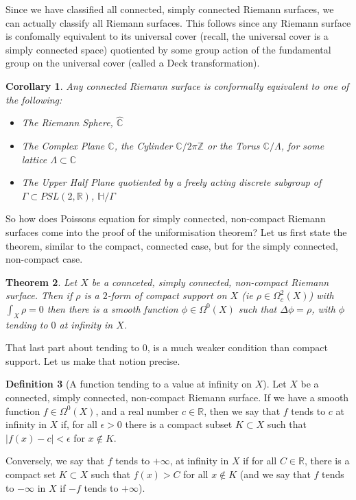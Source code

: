 \documentclass[11pt]{report}
\newtheorem{thm}{Theorem}[section]
\newtheorem{cor}[thm]{Corollary}
\theoremstyle{definition}
\newtheorem{defn}[thm]{Definition}
\begin{document}
Since we have classified all connected, simply connected Riemann surfaces, we can actually classify all Riemann surfaces. This follows since any Riemann surface is confomally equivalent to its universal cover (recall, the universal cover is a simply connected space) quotiented by some group action of the fundamental group on the universal cover (called a Deck transformation).
\begin{cor}
  Any connected Riemann surface is conformally equivalent to one of the following:
  \begin{itemize}
    \item The Riemann Sphere, $\hat{\mathbb{C}}$
    \item The Complex Plane $\mathbb{C}$, the Cylinder $\mathbb{C}/2\pi \mathbb{Z}$ or the Torus $\mathbb{C}/\Lambda$, for some lattice $\Lambda \subset \mathbb{C}$
    \item The Upper Half Plane quotiented by a freely acting discrete subgroup of $\Gamma \subset PSL(2,\mathbb{R})$, $\mathbb{H}/\Gamma$ 
  \end{itemize}
\end{cor}
So how does Poissons equation for simply connected, non-compact Riemann surfaces come into the proof of the uniformisation theorem? Let us first state the theorem, similar to the compact, connected case, but for the simply connected, non-compact case.
\begin{thm}\label{NonCompactPoissons}
  Let $X$ be a connceted, simply connected, non-compact Riemann surface. Then if $\rho$ is a $2$-form of compact support on $X$ (ie $\rho \in \Omega^2_c(X)$) with $\int_X \rho = 0$ then there is a smooth function $\phi \in \Omega^0(X)$ such that $\Delta \phi = \rho$, with $\phi$ tending to $0$ at infinity in $X$.
\end{thm}
That last part about tending to $0$, is a much weaker condition than compact support. Let us make that notion precise.
\begin{defn}[A function tending to a value at infinity on $X$]
  Let $X$ be a connected, simply connected, non-compact Riemann surface. If we have a smooth function $f \in \Omega^0(X)$, and a real number $c \in \mathbb{R}$, then we say that $f$ tends to $c$ at infinity in $X$ if, for all $\epsilon > 0$ there is a compact subset $K \subset X$ such that $|f(x) - c| < \epsilon$ for $x \notin K$.

  Conversely, we say that $f$ tends to $+\infty$, at infinity in $X$ if for all $C \in \mathbb{R}$, there is a compact set $K \subset X$ such that $f(x) > C$ for all $x \notin K$ (and we say that $f$ tends to $-\infty$ in $X$ if $-f$ tends to $+\infty$).
\end{defn}
\end{document}
